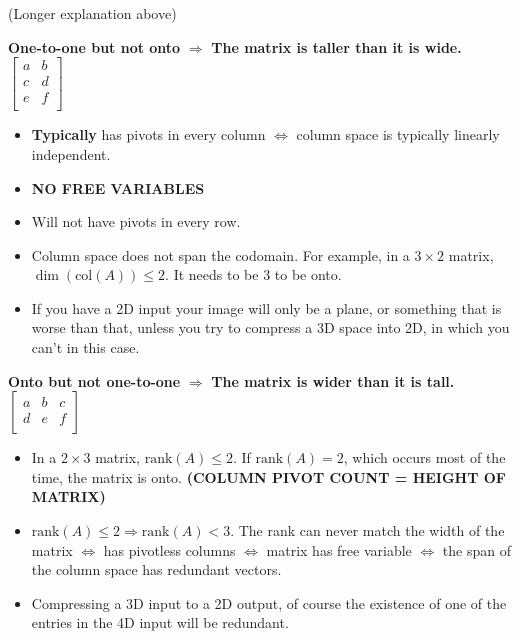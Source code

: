 \documentclass[12pt]{article}
\theoremstyle{plain}
\theoremstyle{remark}
\theoremstyle{definition}
\begin{document}
(Longer explanation above)

\begin{framed}

\textbf{One-to-one but not onto} \(\mathbf{\Rightarrow}\) \textbf{The
matrix is taller than it is wide.} \(\begin{bmatrix}
a & b \\
c & d \\
e & f \\
\end{bmatrix}\)

\begin{itemize}
\item
  \textbf{Typically} has pivots in every column \(\Leftrightarrow\)
  column space is typically linearly independent.
\item
  \textbf{NO FREE VARIABLES}
\item
  Will not have pivots in every row.
\item
  Column space does not span the codomain. For example, in a
  \(3 \times 2\) matrix, \(\dim\left( \text{col}(A) \right) \leq 2\). It
  needs to be 3 to be onto.
\item
  If you have a 2D input your image will only be a plane, or something
  that is worse than that, unless you try to compress a 3D space into
  2D, in which you can't in this case.
\end{itemize}

\textbf{Onto but not one-to-one} \(\mathbf{\Rightarrow}\) \textbf{The
matrix is wider than it is tall.} \(\begin{bmatrix}
a & b & c \\
d & e & f \\
\end{bmatrix}\)

\begin{itemize}
\item
  In a \(2 \times 3\) matrix, \(\text{rank}(A) \leq 2\). If
  \(\text{rank}(A) = 2\), which occurs most of the time, the matrix is
  onto. \textbf{(COLUMN PIVOT COUNT = HEIGHT OF MATRIX)}
\item
  \(\text{rank}(A) \leq 2 \Rightarrow \text{rank}(A) < 3\). The rank can
  never match the width of the matrix \(\Leftrightarrow\) has pivotless
  columns \(\Leftrightarrow\) matrix has free variable
  \(\Leftrightarrow\) the span of the column space has redundant
  vectors.
\item
  Compressing a 3D input to a 2D output, of course the existence of one
  of the entries in the 4D input will be redundant.
\end{itemize}


\end{framed}
\end{document}
